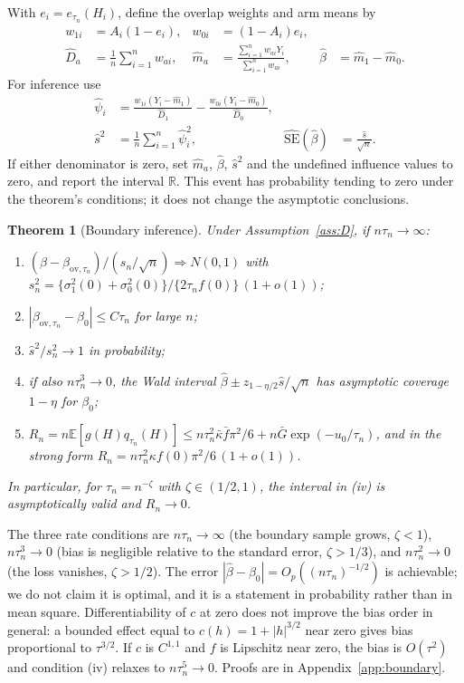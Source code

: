 \documentclass[12pt]{article}
\newtheorem{theorem}{Theorem}
\theoremstyle{definition}
\theoremstyle{remark}
\newcommand{\E}{\mathbb{E}}
\newcommand{\ov}{\mathrm{ov}}
\begin{document}
With $e_i=e_{\tau_n}(H_i)$, define the overlap weights and arm means by
\begin{align}
 w_{1i}&=A_i(1-e_i), & w_{0i}&=(1-A_i)e_i,\nonumber\\
 \hat D_a&=\frac1n\sum_{i=1}^n w_{ai}, &
 \hat m_a&=\frac{\sum_{i=1}^n w_{ai}Y_i}{\sum_{i=1}^n w_{ai}},
 &\hat\beta&=\hat m_1-\hat m_0.\label{eq:boundary-estimator}
\end{align}
For inference use
\begin{align}
 \hat\psi_i&=\frac{w_{1i}(Y_i-\hat m_1)}{\hat D_1}
             -\frac{w_{0i}(Y_i-\hat m_0)}{\hat D_0},\nonumber\\
 \hat s^2&=\frac1n\sum_{i=1}^n\hat\psi_i^2,
 &\widehat{\mathrm{SE}}(\hat\beta)&=\frac{\hat s}{\sqrt n}.
 \label{eq:boundary-se}
\end{align}
If either denominator is zero, set $\hat m_a$, $\hat\beta$, $\hat s^2$
and the undefined influence values to zero, and report the interval
$\mathbb R$. This event has probability tending to zero under the theorem's
conditions; it does not change the asymptotic conclusions.

\begin{theorem}[Boundary inference]\label{thm:boundary}
Under Assumption~\ref{ass:D}, if $n\tau_n\to\infty$:
\begin{enumerate}[label=(\roman*),leftmargin=2em,itemsep=1pt]
\item $(\hat\beta-\beta_{\ov,\tau_n})/(s_n/\sqrt n)\Rightarrow N(0,1)$ with
$s_n^2=\{\sigma_1^2(0)+\sigma_0^2(0)\}/\{2\tau_nf(0)\}\,(1+o(1))$;
\item $|\beta_{\ov,\tau_n}-\beta_0|\le C\tau_n$ for large $n$;
\item $\hat s^2/s_n^2\to1$ in probability;
\item if also $n\tau_n^3\to0$, the Wald interval $\hat\beta\pm
z_{1-\eta/2}\hat s/\sqrt n$ has asymptotic coverage $1-\eta$ for $\beta_0$;
\item $R_n=n\E[g(H)q_{\tau_n}(H)]\le n\tau_n^2\bar\kappa\bar f\pi^2/6+n\bar G\exp(-u_0/\tau_n)$, and in
the strong form $R_n=n\tau_n^2\kappa f(0)\pi^2/6\,(1+o(1))$.
\end{enumerate}
In particular, for $\tau_n=n^{-\zeta}$ with $\zeta\in(1/2,1)$, the interval in
(iv) is asymptotically valid and $R_n\to0$.
\end{theorem}

The three rate conditions are $n\tau_n\to\infty$ (the boundary sample grows,
$\zeta<1$), $n\tau_n^3\to0$ (bias is negligible relative to the standard
error, $\zeta>1/3$), and $n\tau_n^2\to0$ (the loss vanishes, $\zeta>1/2$). The
error $|\hat\beta-\beta_0|=O_p((n\tau_n)^{-1/2})$ is achievable; we do not
claim it is optimal, and it is a statement in probability rather than in mean
square. Differentiability of $c$ at zero does not improve the bias order in
general: a bounded effect equal to $c(h)=1+|h|^{3/2}$ near zero
gives bias proportional to $\tau^{3/2}$. If $c$ is
$C^{1,1}$ and $f$ is Lipschitz near zero, the bias is $O(\tau^2)$ and
condition (iv) relaxes to $n\tau_n^5\to0$. Proofs are in
Appendix~\ref{app:boundary}.
\end{document}
